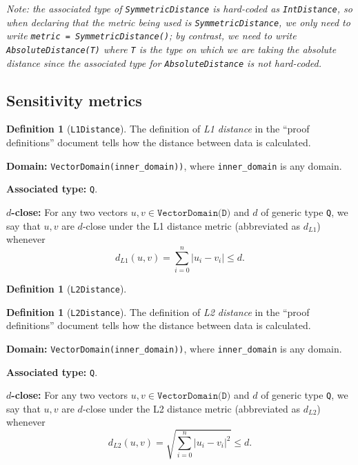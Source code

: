 \documentclass[11pt,a4paper]{article}
\theoremstyle{definition}
\newtheorem{definition}[theorem]{Definition}
\newcommand{\metricDefn}[1]{The definition of \emph{#1} in the ``proof definitions'' document tells how the distance between data is calculated.}
\begin{document}
\emph{Note: the associated type of \texttt{SymmetricDistance} is hard-coded as \texttt{IntDistance}, so when declaring that the metric being used is \texttt{SymmetricDistance}, we only need to write \texttt{metric = SymmetricDistance()}; by contrast, we need to write \texttt{AbsoluteDistance(T)} where \texttt{T} is the type on which we are taking the absolute distance since the associated type for \texttt{AbsoluteDistance} is not hard-coded.}

\subsection{Sensitivity metrics}


\begin{definition}[\texttt{L1Distance}]
    \metricDefn{L1 distance}
    \item \textbf{Domain:} \texttt{VectorDomain(inner\_domain))}, where \texttt{inner\_domain} is any domain.
    \item \textbf{Associated type:} \texttt{Q}.
    \item \textbf{$d$-close:} For any two vectors $u, v \in \texttt{VectorDomain(D)}$ and $d$ of generic type \texttt{Q}, we say that $u, v$ are $d$-close under the L1 distance metric (abbreviated as $d_{L1}$) whenever
    \[
        d_{L1}(u, v) = \sum_{i=0}^n |u_i - v_i| \leq d.
    \]
\end{definition}

\begin{definition}[\texttt{L2Distance}]
    \begin{definition}[\texttt{L2Distance}]
    \metricDefn{L2 distance}
    \item \textbf{Domain:} \texttt{VectorDomain(inner\_domain))}, where \texttt{inner\_domain} is any domain.
    \item \textbf{Associated type:} \texttt{Q}.
    \item \textbf{$d$-close:} For any two vectors $u, v \in \texttt{VectorDomain(D)}$ and $d$ of generic type \texttt{Q}, we say that $u, v$ are $d$-close under the L2 distance metric (abbreviated as $d_{L2}$) whenever
    \[
        d_{L2}(u, v) = \sqrt{\sum_{i=0}^n |u_i - v_i|^2} \leq d.
    \]
\end{definition}
\end{definition}
\end{document}
